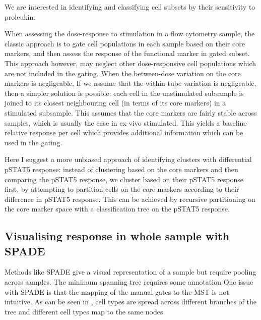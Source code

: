 
We are interested in identifying and classifying cell subsets by their sensitivity to proleukin.

When assessing the dose-response to stimulation in a flow cytometry sample,
the classic approach is to gate cell populations in each sample based on their core markers,
and then assess the response of the functional marker in gated subset.
This approach however, may neglect other dose-responsive cell populations which are not included in the gating.
When the between-dose variation on the core markers is negligeable,
If we assume that the within-tube variation is negligeable, then a simpler solution is possible:
each cell in the unstimulated subsample is joined to its closest neighbouring cell (in terms of its core markers) in a stimulated subsample.
This assumes that the core markers are fairly stable across samples, which is usually the case in ex-vivo stimulated.
This yields a baseline relative response per cell which provides additional information which can be used in the gating.

Here I suggest a more unbiased approach of identifying clusters with differential pSTAT5 response:
instead of clustering based on the core markers and then comparing the pSTAT5 response, we cluster based on their pSTAT5 response first,
by attempting to partition cells on the core markers according to their difference in pSTAT5 response.
This can be achieved by recursive partitioning on the core marker space with a classification tree on the pSTAT5 response.

\subsection{Visualising response in whole sample with SPADE}

Methods like SPADE give a visual representation of a sample but require pooling across samples.
The minimum spanning tree requires some annotation
One issue with SPADE is that the mapping of the manual gates to the MST is not intuitive.
As can be seen in , cell types are spread across different branches of the tree and different cell types map to the same nodes.

